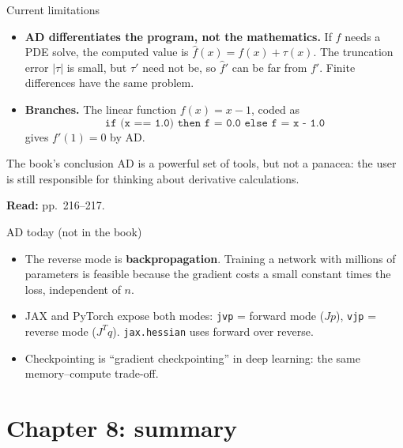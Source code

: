 \documentclass[12pt,aspectratio=169]{beamer}
\newcommand{\readpp}[1]{{\color{red!80!black}\textbf{Read:} #1}}
\begin{document}
\begin{frame}{Current limitations}
  \begin{itemize}
    \item \textbf{AD differentiates the program, not the mathematics.}
      If $f$ needs a PDE solve, the computed value is $\hat f(x)=f(x)+\tau(x)$.
      The truncation error $|\tau|$ is small, but $\tau'$ need not be, so $\hat f'$ can be far from $f'$.
      Finite differences have the same problem.
    \item \textbf{Branches.} The linear function $f(x)=x-1$, coded as
      \[
        \texttt{if (x == 1.0) then f = 0.0 else f = x - 1.0}
      \]
      gives $f'(1)=0$ by AD.
  \end{itemize}
  \begin{block}{The book's conclusion}
    AD is a powerful set of tools, but not a panacea: the user is still responsible for thinking about derivative calculations.
  \end{block}
  \readpp{pp.~216--217.}
\end{frame}

\begin{frame}{AD today (not in the book)}
  \begin{itemize}
    \item The reverse mode is \textbf{backpropagation}. Training a network with millions of parameters
      is feasible because the gradient costs a small constant times the loss, independent of $n$.
    \item JAX and PyTorch expose both modes:
      \texttt{jvp} = forward mode ($J p$), \texttt{vjp} = reverse mode ($J^T q$).
      \texttt{jax.hessian} uses forward over reverse.
    \item Checkpointing is ``gradient checkpointing'' in deep learning: the same memory--compute trade-off.
  \end{itemize}
\end{frame}

\section{Chapter 8: summary}
\end{document}
